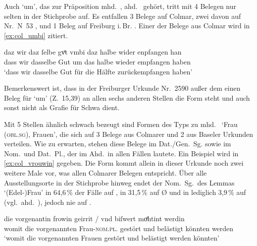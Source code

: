 Auch  `um', das zur Präposition mhd.~, ahd.~
gehört, tritt mit 4 Belegen nur selten in der Stichprobe auf. Es entfallen 3
Belege auf Colmar, zwei davon auf Nr.~N~53 \autocites(Colmar,
1264)[37,2--17]{cao5}, und 1 Beleg auf Freiburg i.\,Br. \autocites(Nr.~2580,
Freiburg i.\,Br., 1297)[9,21--33]{cao4}. Einer der Belege aus Colmar wird in
\cref{ex:col_umbi} zitiert.

\begin{exe}
\ex\label{ex:col_umbi}
	\gll daz wir {daz ſelbe} gvͦt vmbi daz halbe wider enpfangen han \\
		dass wir dasselbe Gut um das halbe wieder empfangen haben \\
	\trans `dass wir dasselbe Gut für die Hälfte  zurückempfangen haben'
		\parencites(Nr.~N~92, Colmar, 1269)[64,27--28]{cao5}
\end{exe}

Bemerkenswert ist, dass in der Freiburger Urkunde Nr.~2590
\autocite[15,32--16,4]{cao4} außer dem einen Beleg für  `um'
(Z.~15,39) an allen sechs anderen Stellen die Form  steht und 
auch sonst nicht als Grafie für Schwa dient.

Mit 5 Stellen ähnlich schwach bezeugt sind Formen des Typs  zu
mhd.~ `Frau (\textsc{obl.sg}), Frauen', die sich auf 3 Belege aus
Colmarer und 2 aus Baseler Urkunden verteilen. Wie zu erwarten, stehen diese
Belege im Dat./Gen.~Sg. sowie im Nom.\ und Dat.~Pl., der im Ahd.\ in allen
Fällen  lautete. Ein Beispiel wird in \cref{ex:col_vrouwin}
gegeben. Die Form kommt allein in dieser Urkunde noch zwei weitere Male vor,
was allen Colmarer Belegen entspricht. Über alle Ausstellungsorte in der
Stichprobe hinweg endet der Nom.~Sg.\ des Lemmas  `(Edel-)Frau' in
64,6\,\% der Fälle auf , in 31,5\,\% auf Ø und in lediglich 3,9\,\% auf
 (vgl.~ahd.~), jedoch nie auf .

\begin{exe}
\ex\label{ex:col_vrouwin}
	 die vorgenantin frowin geirrit / vnd biſwert moͤhtint
			werdin \\
		womit die vorgenannten Frau-\textsc{nom.pl.\FemF} gestört {} und
			belästigt könnten werden \\
	\trans `womit die vorgenannten Frauen gestört und belästigt werden
		könnten'
		\parencites(Nr.~3293, Colmar, 1299)[446,24]{cao4}
\end{exe}

